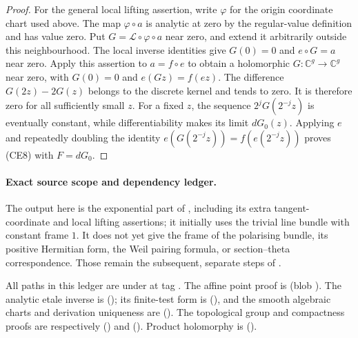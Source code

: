 \begin{proof}
For the general local lifting assertion, write \(\varphi\) for the
origin coordinate chart used above.  The map \(\varphi\circ a\) is
analytic at zero by the regular-value definition and has value zero.
Put \(G=\mathcal L\circ\varphi\circ a\) near zero, and extend it
arbitrarily outside this neighbourhood.  The local inverse identities
give \(G(0)=0\) and \(e\circ G=a\) near zero.
Apply this assertion to \(a=f\circ e\) to obtain a holomorphic
\(G:\mathbb C^g\to\mathbb C^g\) near zero, with \(G(0)=0\) and
\(e(Gz)=f(ez)\).
The difference \(G(2z)-2G(z)\) belongs to the discrete kernel and
tends to zero.  It is therefore zero for all sufficiently small \(z\).
For a fixed \(z\), the sequence \(2^jG(2^{-j}z)\) is eventually
constant, while differentiability makes its limit \(dG_0(z)\).
Applying \(e\) and repeatedly doubling the identity
\(e(G(2^{-j}z))=f(e(2^{-j}z))\) proves (CE8) with \(F=dG_0\).
\end{proof}

\paragraph{Exact source scope and dependency ledger.}
The output here is the exponential part of
, including its extra tangent-coordinate
and local lifting assertions; it initially uses the trivial line bundle
with constant frame \(1\).  It does not yet give the frame of the
polarising bundle, its positive Hermitian form, the Weil pairing formula,
or section--theta correspondence.  Those remain the subsequent,
separate steps of .

All paths in this ledger are under
 at tag
.
The affine point proof is
(blob ).
The analytic etale inverse is
();
its finite-test form is
(), and the smooth
algebraic charts and derivation uniqueness are
().
The topological group and compactness proofs are respectively
() and
().
Product holomorphy is
().

